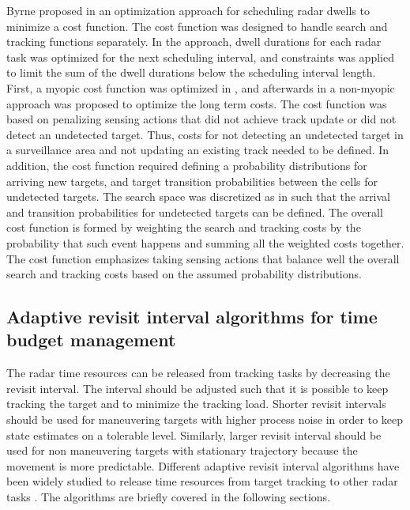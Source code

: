 \documentclass[11pt,a4paper]{article}
\begin{document}
Byrne proposed in \cite{Byrne2015, Byrne2016} an optimization approach for scheduling radar dwells to minimize a cost function. 
The cost function was designed to handle search and tracking functions separately.
In the approach, dwell durations for each radar task was optimized for the next scheduling interval, and constraints was applied to limit the sum of the dwell durations below the scheduling interval length.
First, a myopic cost function was optimized in \cite{Byrne2015}, and afterwards in \cite{Byrne2016} a non-myopic approach was proposed to optimize the long term costs.
The cost function was based on penalizing sensing actions that did not achieve track update or did not detect an undetected target.
Thus, costs for not detecting an undetected target in a surveillance area and not updating an existing track needed to be defined.
In addition, the cost function required defining a probability distributions for arriving new targets, and target transition probabilities between the cells for undetected targets.
The search space was discretized as in \cite{Kreucher2004} such that the arrival and transition probabilities for undetected targets can be defined.
The overall cost function is formed by weighting the search and tracking costs by the probability that such event happens and summing all the weighted costs together.
The cost function emphasizes taking sensing actions that balance well the overall search and tracking costs based on the assumed probability distributions.

\subsection{Adaptive revisit interval algorithms for time budget management} \label{sec:tbm_ri}

The radar time resources can be released from tracking tasks by decreasing the revisit interval. 
The interval should be adjusted such that it is possible to keep tracking the target and to minimize the tracking load.
Shorter revisit intervals should be used for maneuvering targets with higher process noise in order to keep state estimates on a tolerable level. 
Similarly, larger revisit interval should be used for non maneuvering targets with stationary trajectory because the movement is more predictable.
Different adaptive revisit interval algorithms have been widely studied to release time resources from target tracking to other radar tasks \cite{Cohen1986, Gardner1988, Munu1992, ChengTing2007, Baek2010, Watson1993, Charlish2015, Keuk1975, Shin1995, Benoudnine2006, Esfahani2012, Mofrad2017, Christiansen2018, Pilte2018}.
The algorithms are briefly covered in the following sections. 
\end{document}

